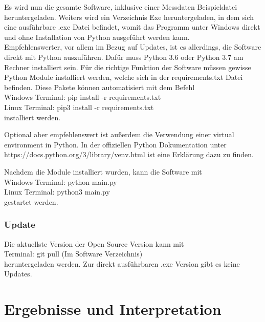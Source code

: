 \documentclass[12pt,a4paper]{article}
\begin{document}
Es wird nun die gesamte Software, inklusive einer Messdaten Beispieldatei heruntergeladen. Weiters wird ein Verzeichnis Exe heruntergeladen, in dem sich eine ausführbare .exe Datei befindet, womit das Programm unter Windows direkt und ohne Installation von Python ausgeführt werden kann.\\

Empfehlenswerter, vor allem im Bezug auf Updates, ist es allerdings, die Software direkt mit Python auszuführen. Dafür muss Python 3.6 oder Python 3.7 am Rechner installiert sein. Für die richtige Funktion der Software müssen gewisse Python Module installiert werden, welche sich in der requirements.txt Datei befinden. Diese Pakete können automatisiert mit dem Befehl\\

Windows Terminal: \textsf{\small pip install -r requirements.txt}\\
Linux Terminal:  \textsf{\small pip3 install -r requirements.txt}\\

installiert werden.

Optional aber empfehlenswert ist außerdem die Verwendung einer virtual environment in Python. In der offiziellen Python Dokumentation unter \textsf{\small https://docs.python.org/3/library/venv.html} ist eine Erklärung dazu zu finden.

Nachdem die Module installiert wurden, kann die Software mit \\

Windows Terminal: \textsf{\small python main.py}\\
Linux Terminal: \textsf{\small python3 main.py}\\

gestartet werden.

\subsubsection{Update}
Die aktuellste Version der Open Source Version kann mit \\

Terminal: \textsf{\small git pull} (Im Software Verzeichnis)\\

heruntergeladen werden. Zur direkt ausführbaren .exe Version gibt es keine Updates.

\pagebreak
\section{Ergebnisse und Interpretation}
\end{document}
